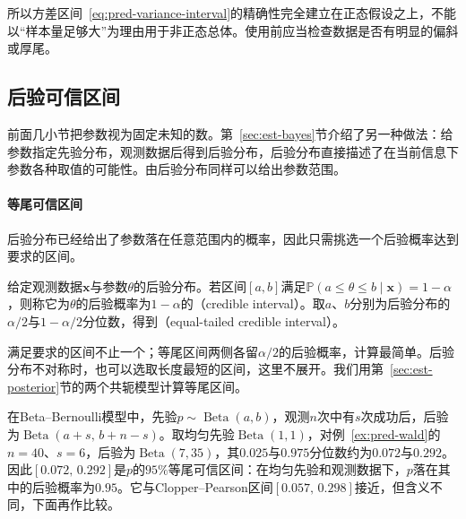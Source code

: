 所以方差区间~\eqref{eq:pred-variance-interval}的精确性完全建立在正态假设之上，不能以“样本量足够大”为理由用于非正态总体。使用前应当检查数据是否有明显的偏斜或厚尾。

\subsection{后验可信区间}

前面几小节把参数视为固定未知的数。第~\ref{sec:est-bayes}节介绍了另一种做法：给参数指定先验分布，观测数据后得到后验分布，后验分布直接描述了在当前信息下参数各种取值的可能性。由后验分布同样可以给出参数范围。

\paragraph{等尾可信区间}

后验分布已经给出了参数落在任意范围内的概率，因此只需挑选一个后验概率达到要求的区间。

\begin{definition}[可信区间]
\label{def:pred-credible-interval}
给定观测数据$\bm x$与参数$\theta$的后验分布。若区间$[a,b]$满足$\mathbb P(a\leq\theta\leq b\mid\bm x)=1-\alpha$，则称它为$\theta$的后验概率为$1-\alpha$的（credible interval）。取$a$、$b$分别为后验分布的$\alpha/2$与$1-\alpha/2$分位数，得到（equal-tailed credible interval）。
\end{definition}

满足要求的区间不止一个；等尾区间两侧各留$\alpha/2$的后验概率，计算最简单。后验分布不对称时，也可以选取长度最短的区间，这里不展开。我们用第~\ref{sec:est-posterior}节的两个共轭模型计算等尾区间。

\begin{example}[不合格率的可信区间]
\label{ex:pred-beta-credible}
在Beta--Bernoulli模型中，先验$p\sim\operatorname{Beta}(a,b)$，观测$n$次中有$s$次成功后，后验为$\operatorname{Beta}(a+s,\,b+n-s)$。取均匀先验$\operatorname{Beta}(1,1)$，对例~\ref{ex:pred-wald}的$n=40$、$s=6$，后验为$\operatorname{Beta}(7,35)$，其$0.025$与$0.975$分位数约为$0.072$与$0.292$。因此$[0.072,\,0.292]$是$p$的$95\%$等尾可信区间：在均匀先验和观测数据下，$p$落在其中的后验概率为$0.95$。它与Clopper--Pearson区间$[0.057,\,0.298]$接近，但含义不同，下面再作比较。
\end{example}

